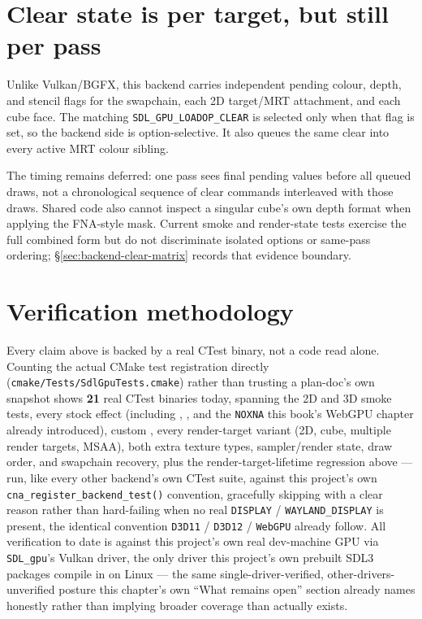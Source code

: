 \section{Clear state is per target, but still per pass}

Unlike Vulkan/BGFX, this backend carries independent pending colour, depth, and stencil flags
for the swapchain, each 2D target/MRT attachment, and each cube face. The matching
\texttt{SDL\_GPU\_LOADOP\_CLEAR} is selected only when that flag is set, so the backend side is
option-selective. It also queues the same clear into every active MRT colour sibling.

The timing remains deferred: one pass sees final pending values before all queued draws, not a
chronological sequence of clear commands interleaved with those draws. Shared code also cannot
inspect a singular cube's own depth format when applying the FNA-style mask. Current smoke and
render-state tests exercise the full combined form but do not discriminate isolated options or
same-pass ordering; \S\ref{sec:backend-clear-matrix} records that evidence boundary.

\section{Verification methodology}

Every claim above is backed by a real CTest binary, not a code read alone. Counting the actual
CMake test registration directly (\texttt{cmake/Tests/SdlGpuTests.cmake}) rather than trusting a
plan-doc's own snapshot shows \textbf{21} real CTest binaries today, spanning the 2D and 3D
smoke tests, every stock effect (including ,
, and the \texttt{NOXNA}  this book's WebGPU chapter
already introduced), custom , every render-target variant (2D, cube,
multiple render targets, MSAA), both extra texture types, sampler/render state, draw order, and
swapchain recovery, plus the render-target-lifetime regression above --- run, like every other backend's own CTest suite, against this project's
own \texttt{cna\_register\_backend\_test()} convention, gracefully skipping with a clear reason
rather than hard-failing when no real \texttt{DISPLAY} / \texttt{WAYLAND\_DISPLAY} is present, the
identical convention \texttt{D3D11} / \texttt{D3D12} / \texttt{WebGPU} already follow. All verification
to date is against this project's own real dev-machine GPU via \texttt{SDL\_gpu}'s Vulkan
driver, the only driver this project's own prebuilt SDL3 packages compile in on Linux --- the
same single-driver-verified, other-drivers-unverified posture this chapter's own ``What remains
open'' section already names honestly rather than implying broader coverage than actually
exists.
